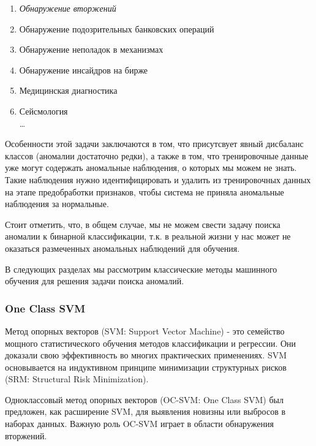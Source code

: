 \documentclass[12pt]{article}
\begin{document}
    \begin{enumerate}
        \item \textit{Обнаружение вторжений}
        \item Обнаружение подозрительных банковских операций
        \item Обнаружение неполадок в механизмах
        \item Обнаружение инсайдров на бирже
        \item Медицинская диагностика
        \item Сейсмология \\
        \ldots
    \end{enumerate}

    \par Особенности этой задачи заключаются в том, что присутсвует явный дисбаланс классов (аномалии достаточно редки), а также в том, что тренировочные данные уже могут содержать аномальные наблюдения, о которых мы можем не знать. Такие наблюдения нужно идентифицировать и удалить из тренировочных данных на этапе предобработки признаков, чтобы система не приняла аномальные наблюдения за нормальные.
    
    \par Стоит отметить, что, в общем случае, мы не можем свести задачу поиска аномалии к бинарной классификации, т.к. в реальной жизни у нас может не оказаться размеченных аномальных наблюдений для обучения.

    \par В следующих разделах мы рассмотрим классические методы машинного обучения для решения задачи поиска аномалий.


    \subsubsection{One Class SVM}
    \label{sec:Research:Model:OneClassSVM}

    \par Метод опорных векторов (SVM: Support Vector Machine) - это семейство мощного статистического обучения методов классификации и регрессии. Они доказали свою эффективность во многих практических применениях. SVM основывается на индуктивном принципе минимизации структурных рисков (SRM: Structural Risk Minimization).

    \par Одноклассовый метод опорных векторов (OC-SVM: One Class SVM) был предложен, как расширение SVM, для выявления новизны или выбросов в наборах данных. Важную роль OC-SVM играет в области обнаружения вторжений.
\end{document}
